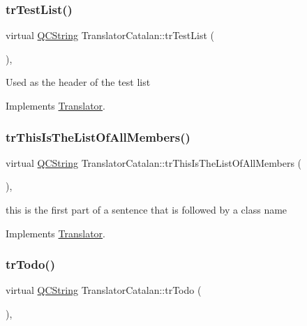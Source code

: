 \subsubsection{\texorpdfstring{trTestList()}{trTestList()}}
{\footnotesize\ttfamily virtual \mbox{\hyperlink{class_q_c_string}{Q\+C\+String}} Translator\+Catalan\+::tr\+Test\+List (\begin{DoxyParamCaption}{ }\end{DoxyParamCaption})\hspace{0.3cm}{\ttfamily [inline]}, {\ttfamily [virtual]}}

Used as the header of the test list 

Implements \mbox{\hyperlink{class_translator}{Translator}}.

\mbox{\label{class_translator_catalan_a0e6bff7c301f519ba8950faab6278cd4}} 
\subsubsection{\texorpdfstring{trThisIsTheListOfAllMembers()}{trThisIsTheListOfAllMembers()}}
{\footnotesize\ttfamily virtual \mbox{\hyperlink{class_q_c_string}{Q\+C\+String}} Translator\+Catalan\+::tr\+This\+Is\+The\+List\+Of\+All\+Members (\begin{DoxyParamCaption}{ }\end{DoxyParamCaption})\hspace{0.3cm}{\ttfamily [inline]}, {\ttfamily [virtual]}}

this is the first part of a sentence that is followed by a class name 

Implements \mbox{\hyperlink{class_translator}{Translator}}.

\mbox{\label{class_translator_catalan_aadcd897e2e396049c74ac5c00c5722a2}} 
\subsubsection{\texorpdfstring{trTodo()}{trTodo()}}
{\footnotesize\ttfamily virtual \mbox{\hyperlink{class_q_c_string}{Q\+C\+String}} Translator\+Catalan\+::tr\+Todo (\begin{DoxyParamCaption}{ }\end{DoxyParamCaption})\hspace{0.3cm}{\ttfamily [inline]}, {\ttfamily [virtual]}}

